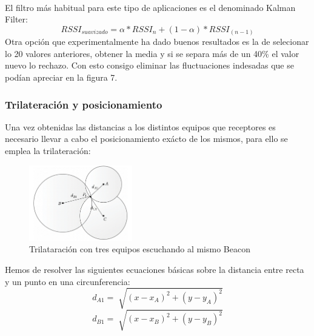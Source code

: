 \documentclass[paper=a4, fontsize=11pt,twoside]{scrartcl}	%
\begin{document}
            \paragraph{}
            El filtro más habitual para este tipo de aplicaciones es el denominado Kalman Filter:
            \begin{equation}
                RSSI_{suavizado} = \alpha * RSSI_{n} + (1-\alpha) * RSSI_{(n-1)}
            \end{equation}
            Otra opción que experimentalmente ha dado buenos resultados es la de selecionar lo 20 valores anteriores,
            obtener la media y si se separa más de un 40\% el valor nuevo lo rechazo. Con esto consigo eliminar las 
            fluctuaciones indesadas que se podían apreciar en la figura 7.
        \subsubsection{Trilateración y posicionamiento}
            Una vez obtenidas las distancias a los distintos equipos que receptores es necesario llevar a cabo el
            posicionamiento exácto de los mismos, para ello se emplea la trilateración:
            \begin{center}
                \begin{figure}[h]
                    \centering
                    \includegraphics[width=0.4\textwidth]{trilateration_circle.png}
                    \caption{Trilataración con tres equipos escuchando al mismo Beacon}
                    \label{fig:mesh7}
                \end{figure}
            \end{center}
                Hemos de resolver las siguientes ecuaciones básicas sobre la distancia entre recta y un punto en 
                una circunferencia:
                \begin{equation}
                    d_{A1}= \sqrt[]{(x-x_A)^2+(y-y_A)^2}
                \end{equation}
                \begin{equation}
                d_{B1}= \sqrt[]{(x-x_B)^2+(y-y_B)^2}
                \end{equation}
\end{document}

